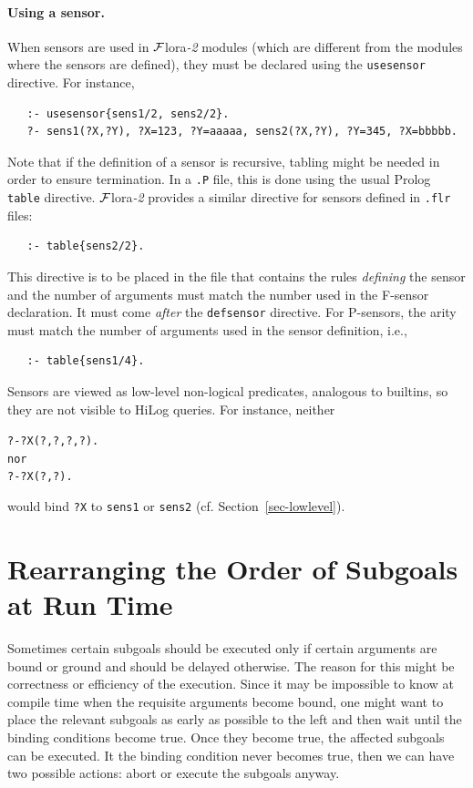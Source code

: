 \documentclass[11pt]{article}
\newcommand{\FLSYSTEM}{{\mbox{\sc ${\cal F}${lora}\rm\emph{-2}}}\xspace}
\newcommand{\flrext}{flr}
\newcommand{\bs}{{\ensuremath\backslash}}
\begin{document}
\paragraph{Using a sensor.}
When sensors are
used in \FLSYSTEM modules (which are different from the modules where the
sensors are defined), they must be declared using the
\texttt{usesensor} directive.  For instance,
\begin{verbatim}
   :- usesensor{sens1/2, sens2/2}.
   ?- sens1(?X,?Y), ?X=123, ?Y=aaaaa, sens2(?X,?Y), ?Y=345, ?X=bbbbb.
\end{verbatim}

Note that if the definition of a sensor is recursive, tabling might be
needed in order to ensure termination. In a \texttt{.P} file, this is done
using the usual Prolog \texttt{table} directive. \FLSYSTEM provides a similar
directive for sensors defined in \texttt{.\flrext} files:
\index{\bs{}table directive}
\begin{verbatim}
   :- table{sens2/2}.
\end{verbatim}
This directive is to be placed in the file that contains the rules \emph{defining}
the sensor and the number of arguments must match the number used in the
F-sensor declaration.
It must come \emph{after} the \texttt{defsensor} directive.  
For P-sensors, the arity must match the number of arguments used in the
sensor definition, i.e.,
\begin{verbatim}
   :- table{sens1/4}.
\end{verbatim}


Sensors are viewed as low-level non-logical predicates, analogous to
builtins, so
they are not visible to HiLog queries. For instance, neither
\begin{alltt}
   ?- ?X(?,?,?,?).
\textnormal{nor}
   ?- ?X(?,?).
\end{alltt}
would bind \texttt{?X}  to \texttt{sens1} or \texttt{sens2}
(cf. Section~\ref{sec-lowlevel}).

  
\section{Rearranging the Order of Subgoals at Run Time}
\label{sev-rearanging}

Sometimes certain subgoals should be executed only if certain arguments are
bound or ground and should be delayed otherwise.
The reason for this might be correctness or efficiency of the execution.
Since it may be impossible to know at compile time when the requisite
arguments become bound, one might want to place the relevant subgoals as
early as possible to the left and then wait until the binding conditions
become true. Once they become true, the affected subgoals can be
executed. It the binding condition never becomes true, then we can have two
possible actions: abort or execute the subgoals anyway.
\end{document}
